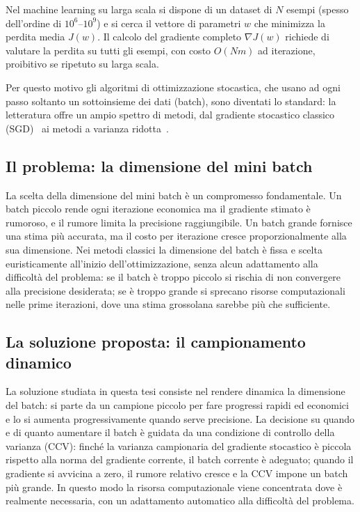 \documentclass[a4paper,12pt]{article}
\numberwithin{equation}{section}
\numberwithin{figure}{section}
\numberwithin{table}{section}
\begin{document}
Nel machine learning su larga scala si dispone di un dataset di $N$
esempi (spesso dell'ordine di $10^6$--$10^9$) e si cerca il vettore di
parametri $w$ che minimizza la perdita media $J(w)$. Il calcolo del gradiente
completo $\nabla J(w)$ richiede di valutare la perdita su tutti gli esempi,
con costo $O(Nm)$ ad iterazione, proibitivo se ripetuto su larga scala.

Per questo motivo gli algoritmi di ottimizzazione stocastica, che usano ad ogni
passo soltanto un sottoinsieme dei dati (batch), sono diventati lo standard: la
letteratura offre un ampio spettro di metodi, dal gradiente stocastico classico
(SGD)~\cite{robbins1951, bottou2008} ai metodi a varianza
ridotta~\cite{defazio2014, johnson2013}.

\subsection{Il problema: la dimensione del mini batch}

La scelta della dimensione del mini batch è un compromesso fondamentale. Un
batch piccolo rende ogni iterazione economica ma il gradiente stimato è
rumoroso, e il rumore limita la precisione raggiungibile. Un batch
grande fornisce una stima più accurata, ma il costo per iterazione cresce
proporzionalmente alla sua dimensione. Nei metodi classici la dimensione del
batch è fissa e scelta euristicamente all'inizio
dell'ottimizzazione, senza alcun adattamento alla difficoltà del problema:
se il batch è troppo piccolo si rischia di non convergere alla precisione
desiderata; se è troppo grande si sprecano risorse computazionali nelle prime
iterazioni, dove una stima grossolana sarebbe più che sufficiente.

\subsection{La soluzione proposta: il campionamento dinamico}

La soluzione studiata in questa tesi consiste nel rendere dinamica la
dimensione del batch: si parte da un campione piccolo per fare progressi rapidi
ed economici e lo si aumenta progressivamente quando serve precisione. La
decisione su quando e di quanto aumentare il batch è guidata da
una condizione di controllo della varianza (CCV): finché la varianza
campionaria del gradiente stocastico è piccola rispetto alla norma del
gradiente corrente, il batch corrente è adeguato; quando il gradiente si
avvicina a zero, il rumore relativo cresce e la CCV impone un batch più grande.
In questo modo la risorsa computazionale viene concentrata dove è realmente
necessaria, con un adattamento automatico alla difficoltà del problema.
\end{document}
